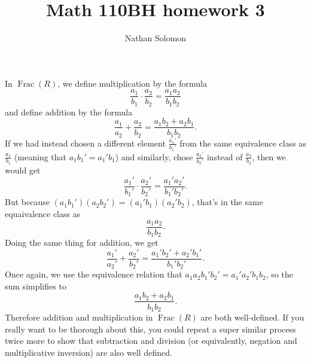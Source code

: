 \documentclass[12pt]{article}
\begin{document}
\title{Math 110BH homework 3}
\author{Nathan Solomon}
\maketitle

\section{}
\noindent{}\bigskip\par
\par
In $\operatorname{Frac}(R)$, we define multiplication by the formula
\[ \frac{a_1}{b_1} \cdot \frac{a_2}{b_2} = \frac{a_1a_2}{b_1b_2} \]
and define addition by the formula
\[ \frac{a_1}{a_2} + \frac{a_2}{b_2} = \frac{a_1b_2+a_2b_1}{b_1b_2}. \]
If we had instead chosen a different element $\frac{a_1'}{b_1'}$ from the same equivalence class as $\frac{a_1}{b_1}$ (meaning that $a_1b_1'=a_1'b_1$) and similarly, chose $\frac{a_2'}{b_2'}$ instead of $\frac{a_2}{b_2}$, then we would get
\[ \frac{a_1'}{b_1'} \cdot \frac{a_2'}{b_2'} = \frac{a_1'a_2'}{b_1'b_2'}. \]
But because $(a_1b_1')(a_2b_2')=(a_1'b_1)(a_2'b_2)$, that's in the same equaivalence class as
\[ \frac{a_1a_2}{b_1b_2}. \]
Doing the same thing for addition, we get
\[ \frac{a_1'}{a_2'} + \frac{a_2'}{b_2'} = \frac{a_1'b_2'+a_2'b_1'}{b_1'b_2'}. \]
Once again, we use the equivalence relation that $a_1a_2b_1'b_2'=a_1'a_2'b_1b_2$, so the sum simplifies to
\[ \frac{a_1b_2+a_2b_1}{b_1b_2}. \]
Therefore addition and multiplication in $\operatorname{Frac}(R)$ are both well-defined. If you really want to be thorough about this, you could repeat a super similar process twice more to show that subtraction and division (or equivalently, negation and multiplicative inversion) are also well defined.
\end{document}
